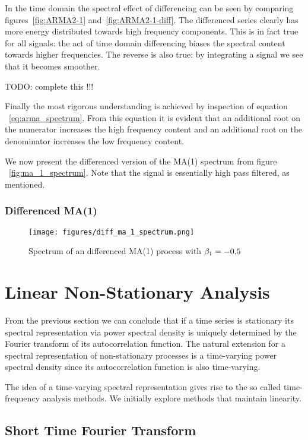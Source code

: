 In the time domain the spectral effect of differencing can be seen by comparing
figures~\ref{fig:ARMA2-1} and~\ref{fig:ARMA2-1-diff}. The differenced series
clearly has more energy distributed towards high frequency components. This is
in fact true for all signals: the act of time domain differencing biases the
spectral content towards higher frequencies. The reverse is also true: by
integrating a signal we see that it becomes smoother.

TODO: complete this !!!

Finally the most rigorous understanding is achieved by inspection of equation
~\ref{eq:arma_spectrum}. From this equation it is evident that an additional
root on the numerator increases the high frequency content and an additional
root on the denominator increases the low frequency content.

We now present the differenced version of the MA(1) spectrum from figure
~\ref{fig:ma_1_spectrum}. Note that the signal is essentially high pass
filtered, as mentioned.

\subsubsection{Differenced MA(1)}

\begin{figure}[H]
    \centering
    \texttt{[image: figures/diff\_ma\_1\_spectrum.png]}
    \caption{Spectrum of an differenced MA(1) process with
    $\protect \beta_1 = -0.5$}
    \label{fig:diff_ma_1_spectrum}
\end{figure}


\section{Linear Non-Stationary Analysis}

From the previous section we can conclude that if a time series is stationary
its spectral representation via power spectral density is uniquely determined
by the Fourier transform of its autocorrelation function. The natural extension
for a spectral representation of non-stationary processes is a time-varying
power spectral density since its autocorrelation function is also time-varying.

The idea of a time-varying spectral representation gives rise to the so called
time-frequency analysis methods. We initially explore methods that maintain
linearity.

\subsection{Short Time Fourier Transform}

